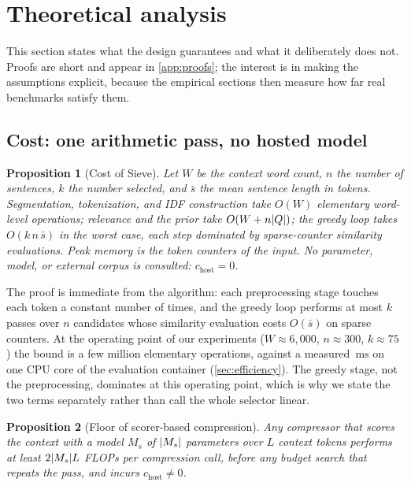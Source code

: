 \documentclass[review,12pt]{elsarticle}
\DeclarePairedDelimiter\abs{\lvert}{\rvert}
\newtheorem{proposition}{Proposition}
\theoremstyle{remark}
\newcommand{\method}{Sieve}
\newcommand{\ms}{\ensuremath{\mathrm{ms}}}
\begin{document}
\section{Theoretical analysis}
\label{sec:theory}
This section states what the design guarantees and what it
deliberately does not. Proofs are short and appear in
\autoref{app:proofs}; the interest is in making the assumptions
explicit, because the empirical sections then measure how far real
benchmarks satisfy them.

\subsection{Cost: one arithmetic pass, no hosted model}
\begin{proposition}[Cost of \method{}]
\label{prop:cost}
Let $W$ be the context word count, $n$ the number of sentences, $k$
the number selected, and $\bar{s}$ the mean sentence length in tokens.
Segmentation, tokenization, and IDF construction take $O(W)$
elementary word-level operations; relevance and the prior take
$O(W + n\abs{Q})$; the greedy loop takes $O(k\,n\,\bar{s})$ in the
worst case, each step dominated by sparse-counter similarity
evaluations. Peak memory is the token counters of the input. No
parameter, model, or external corpus is consulted:
$c_{\mathrm{host}} = 0$.
\end{proposition}

The proof is immediate from the algorithm: each preprocessing stage
touches each token a constant number of times, and the greedy loop
performs at most $k$ passes over $n$ candidates whose similarity
evaluation costs $O(\bar{s})$ on sparse counters. At the operating
point of our experiments ($W \approx 6{,}000$, $n \approx 300$,
$k \approx 75$) the bound is a few million elementary operations,
against a measured \TimeSieSixk\,\ms{} on one CPU core of the
evaluation container (\autoref{sec:efficiency}). The greedy stage, not
the preprocessing, dominates at this operating point, which is why we
state the two terms separately rather than call the whole selector
linear.

\begin{proposition}[Floor of scorer-based compression]
\label{prop:floor}
Any compressor that scores the context with a model $M_s$ of
$\abs{M_s}$ parameters over $L$ context tokens performs at least
$2\abs{M_s} L$ FLOPs per compression call, before any budget search
that repeats the pass, and incurs $c_{\mathrm{host}} \ne 0$.
\end{proposition}
\end{document}
